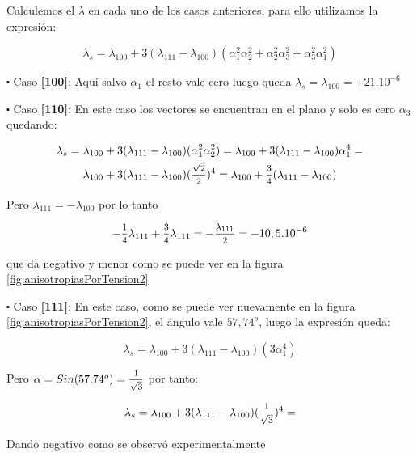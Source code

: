 Calculemos el $\lambda$ en cada uno de los casos anteriores, para ello utilizamos la expresión:

\begin{equation}
\lambda_{s}= \lambda_{100} + 3 (\lambda_{111} - \lambda_{100})(\alpha_{1}^{2}\alpha_{2}^{2}+\alpha_{2}^{2}\alpha_{3}^{2}+\alpha_{3}^{2}\alpha_{1}^{2})
\end{equation}

$\centerdot$ Caso \textbf{[100]}: Aquí salvo $\alpha_{1}$ el resto vale cero luego queda $\lambda_{s}= \lambda_{100} = +21.10^{-6}$

$\centerdot$ Caso \textbf{[110]}: En este caso los vectores se encuentran en el plano y solo es cero $\alpha_{3}$ quedando:

\begin{multline}
\lambda_{s}= 
\lambda_{100} + 3 (\lambda_{111} - \lambda_{100})(\alpha_{1}^{2}\alpha_{2}^{2})=
\lambda_{100} + 3 (\lambda_{111} - \lambda_{100})\alpha_{1}^{4}= \\
\lambda_{100} + 3 (\lambda_{111} - \lambda_{100})(\mfrac{\sqrt{2}}{2})^{4}=
\lambda_{100} + \mfrac{3}{4} (\lambda_{111} - \lambda_{100})
\end{multline}


Pero $\lambda_{111}=-\lambda_{100}$ por lo tanto

\begin{equation}
- \mfrac{1}{4} \lambda_{111} + \mfrac{3}{4}\lambda_{111}= -\mfrac{\lambda_{111}}{2} = -10,5.10^{-6}
\end{equation}

que da negativo y menor como se puede ver en la figura \ref{fig:anisotropiasPorTension2}

$\centerdot$ Caso \textbf{[111]}: En este caso, como se puede ver nuevamente en la figura \ref{fig:anisotropiasPorTension2}, el ángulo vale $57,74^{o}$, luego la expresión queda:

\begin{equation}
\lambda_{s}= \lambda_{100} + 3 (\lambda_{111} - \lambda_{100})(3 \alpha_{1}^{4})
\end{equation}

Pero ${\alpha =  Sin(57.74^{o}) = \mfrac{1}{\sqrt{3}}}$ por tanto:

\begin{equation}
\lambda_{s}= 
\lambda_{100} + 3 (\lambda_{111} - \lambda_{100})(\mfrac{1}{\sqrt{3}})^{4}=
\end{equation}

Dando negativo como se observó experimentalmente

